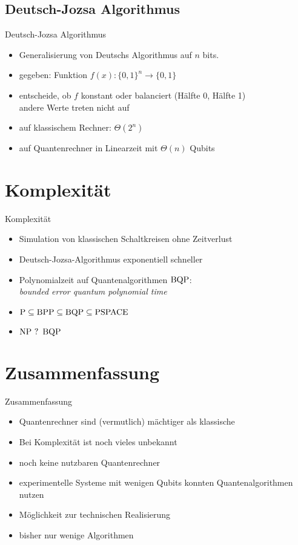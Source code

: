 \documentclass[xcolor=colortbl
,ngerman
]{beamer}
\begin{document}
\subsection{Deutsch-Jozsa Algorithmus}
\begin{frame}{Deutsch-Jozsa Algorithmus}
    \begin{itemize}
        \item Generalisierung von Deutschs Algorithmus auf $n$ bits.
        \item gegeben: Funktion $f(x) : \{0,1\}^n \rightarrow \{0,1\}$
        \item entscheide, ob $f$ konstant oder balanciert (Hälfte 0, Hälfte 1)\\
            andere Werte treten nicht auf
        \item auf klassischem Rechner: $\Theta(2^n)$
        \item auf Quantenrechner in Linearzeit mit $\Theta(n)$ Qubits
    \end{itemize}
\end{frame}

\section{Komplexität}
\begin{frame}{Komplexität}
    \begin{itemize}
        \item Simulation von klassischen Schaltkreisen ohne Zeitverlust
        \item Deutsch-Jozsa-Algorithmus exponentiell schneller
        \item Polynomialzeit auf Quantenalgorithmen $\operatorname{BQP}$: \\
            \emph{bounded error quantum polynomial time}
        \item $ \operatorname{P} \subseteq \operatorname{BPP} \subseteq \operatorname{BQP} \subseteq \operatorname{PSPACE} $
        \item $\operatorname{NP}~?~\operatorname{BQP}$
    \end{itemize}
\end{frame}

\section{Zusammenfassung}
\begin{frame}{Zusammenfassung}
    \begin{itemize}
        \item Quantenrechner sind (vermutlich) mächtiger als klassische
        \item Bei Komplexität ist noch vieles unbekannt
        \item noch keine nutzbaren Quantenrechner
        \item experimentelle Systeme mit wenigen Qubits konnten Quantenalgorithmen nutzen
        \item Möglichkeit zur technischen Realisierung
        \item bisher nur wenige Algorithmen
    \end{itemize}
\end{frame}
\end{document}
